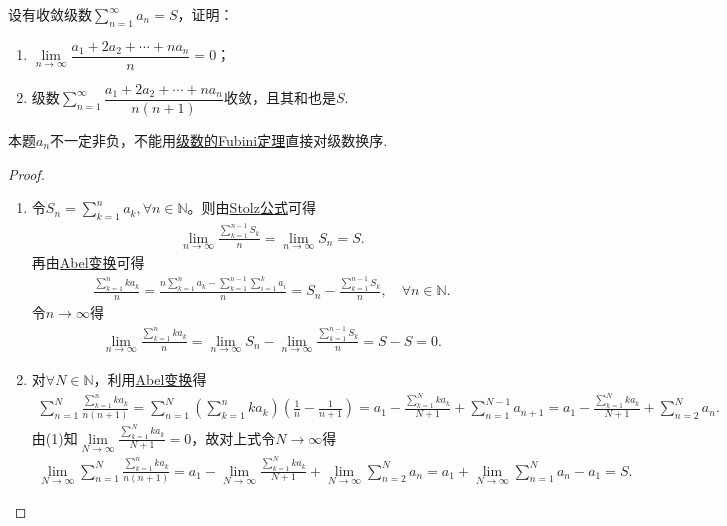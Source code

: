 \documentclass[../../main.tex]{subfiles}%
\begin{document}
\begin{example}
设有收敛级数$\sum\limits_{n=1}^{\infty} a_n = S$，证明：
\begin{enumerate}[(1)]
\item $\lim\limits_{n\to\infty} \dfrac{a_1 + 2a_2 + \cdots + na_n}{n} = 0$；
\item 级数$\sum\limits_{n=1}^{\infty} \dfrac{a_1 + 2a_2 + \cdots + na_n}{n(n+1)}$收敛，且其和也是$S$.
\end{enumerate}
\end{example}
\begin{note}
本题$a_n$不一定非负，不能用\hyperref[theorem:级数的Fubini定理]{级数的Fubini定理}直接对级数换序.
\end{note}
\begin{proof}
\begin{enumerate}[(1)]
\item 令$S_n = \sum\limits_{k=1}^n a_k, \forall n\in\mathbb{N}$。则由\hyperref[theorem:Stolz定理]{Stolz公式}可得
\begin{align*}
\lim_{n\to\infty} \frac{\sum\limits_{k=1}^{n-1} S_k}{n} = \lim_{n\to\infty} S_n = S.
\end{align*}
再由\hyperref[theorem:Abel变换]{Abel变换}可得
\begin{align*}
\frac{\sum\limits_{k=1}^n ka_k}{n} = \frac{n\sum\limits_{k=1}^n a_k - \sum\limits_{k=1}^{n-1} \sum\limits_{i=1}^k a_i}{n} = S_n - \frac{\sum\limits_{k=1}^{n-1} S_k}{n}, \quad \forall n\in\mathbb{N}.
\end{align*}
令$n\to\infty$得
\begin{align*}
\lim_{n\to\infty} \frac{\sum\limits_{k=1}^n ka_k}{n} = \lim_{n\to\infty} S_n - \lim_{n\to\infty} \frac{\sum\limits_{k=1}^{n-1} S_k}{n} = S - S = 0.
\end{align*}

\item 对$\forall N\in\mathbb{N}$，利用\hyperref[theorem:Abel变换]{Abel变换}得
\begin{align*}
\sum_{n=1}^N \frac{\sum\limits_{k=1}^n ka_k}{n(n+1)}
= \sum_{n=1}^N \left( \sum_{k=1}^n ka_k \right) \left( \frac{1}{n} - \frac{1}{n+1} \right) 
= a_1 - \frac{\sum\limits_{k=1}^N ka_k}{N+1} + \sum_{n=1}^{N-1} a_{n+1} 
= a_1 - \frac{\sum\limits_{k=1}^N ka_k}{N+1} + \sum_{n=2}^N a_n.
\end{align*}
由(1)知$\lim\limits_{N\to\infty} \frac{\sum\limits_{k=1}^N ka_k}{N+1} = 0$，故对上式令$N\to\infty$得
\begin{align*}
\lim_{N\to\infty} \sum_{n=1}^N \frac{\sum\limits_{k=1}^n ka_k}{n(n+1)}
= a_1 - \lim_{N\to\infty} \frac{\sum\limits_{k=1}^N ka_k}{N+1} + \lim_{N\to\infty} \sum_{n=2}^N a_n 
= a_1 + \lim_{N\to\infty} \sum_{n=1}^N a_n - a_1 = S.
\end{align*}
\end{enumerate}
\end{proof}
\end{document}
